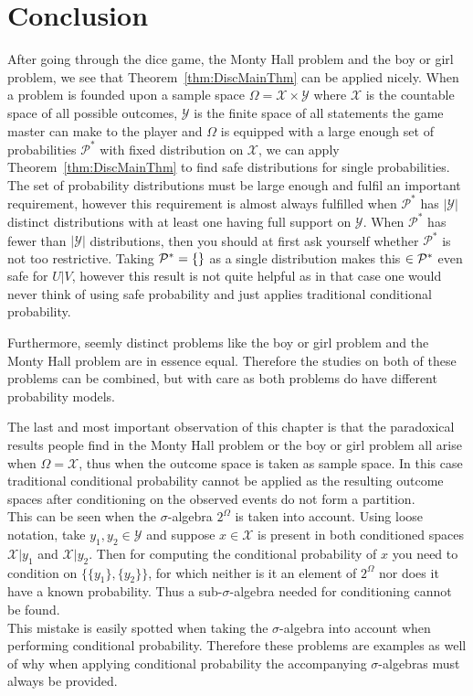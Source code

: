 \documentclass[a4paper]{report}
\theoremstyle{plain}
\theoremstyle{definition}
\theoremstyle{remark}
\numberwithin{equation}{chapter}
\let\P\relax
\DeclareMathOperator{\P}{\mathbb{P}}
\DeclareMathOperator{\1}{\mathbbm{1}}
\newcommand{\X}{\mathcal{X}}
\newcommand{\Y}{\mathcal{Y}}
\newcommand{\Pmod}{\mathcal{P}^*}
\begin{document}
\section{Conclusion}\label{sec:DiscConcl}
After going through the dice game, the Monty Hall problem and the boy or girl problem, we see that Theorem~\ref{thm:DiscMainThm} can be applied nicely. When a problem is founded upon a sample space $\Omega=\X\times\Y$ where $\X$ is the countable space of all possible outcomes, $\Y$ is the finite space of all statements the game master can make to the player and $\Omega$ is equipped with a large enough set of probabilities $\Pmod$ with fixed distribution on $\X$, we can apply Theorem~\ref{thm:DiscMainThm} to find safe distributions for single probabilities. The set of probability distributions must be large enough and fulfil an important requirement, however this requirement is almost always fulfilled when $\Pmod$ has $|\Y|$ distinct distributions with at least one having full support on $\Y$. When $\Pmod$ has fewer than $|\Y|$ distributions, then you should at first ask yourself whether $\Pmod$ is not too restrictive. Taking $\Pmod=\{\P\}$ as a single distribution makes this $\P\in\Pmod$ even safe for $U|V$, however this result is not quite helpful as in that case one would never think of using safe probability and just applies traditional conditional probability.

Furthermore, seemly distinct problems like the boy or girl problem and the Monty Hall problem are in essence equal. Therefore the studies on both of these problems can be combined, but with care as both problems do have different probability models.

The last and most important observation of this chapter is that the paradoxical results people find in the Monty Hall problem or the boy or girl problem all arise when $\Omega=\X$, thus when the outcome space is taken as sample space. In this case traditional conditional probability cannot be applied as the resulting outcome spaces after conditioning on the observed events do not form a partition.\\
This can be seen when the $\sigma$-algebra $2^{\Omega}$ is taken into account. Using loose notation, take $y_1,y_2\in\Y$ and suppose $x\in\X$ is present in both conditioned spaces $\X|y_1$ and $\X|y_2$. Then for computing the conditional probability of $x$ you need to condition on $\{\{y_1\},\{y_2\}\}$, for which neither is it an element of $2^\Omega$ nor does it have a known probability. Thus a sub-$\sigma$-algebra needed for conditioning cannot be found.\\
This mistake is easily spotted when taking the $\sigma$-algebra into account when performing conditional probability. Therefore these problems are examples as well of why when applying conditional probability the accompanying $\sigma$-algebras must always be provided.
\end{document}
